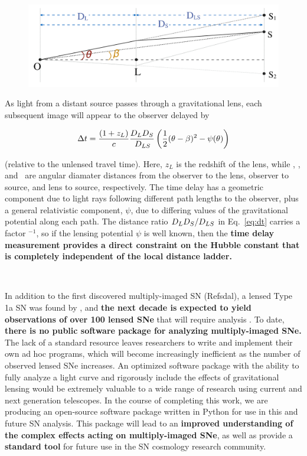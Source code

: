 \pagebreak


\

\begin{figure}[h]
\centering
\vspace{-1em}
\includegraphics[width=.7\textwidth]{FIG/lensingGeometry2}
\end{figure}

As light from a distant
source passes through a gravitational lens, each subsequent image will appear to the observer delayed by 


\begin{equation}\label{eq:dt}
  \Delta t = \frac{(1+z_L)}{c}\frac{D_L D_S}{\,D_{LS}} \left(\frac{1}{2}(\theta-\beta)^2 - \psi(\theta)\right)
\end{equation}

\noindent (relative to the unlensed travel time). Here, $z_L$ is the redshift of the lens, while \Dl, \Ds, 
and \Dls\ are angular diamater distances from the observer to the
lens, observer to source, and lens to source, respectively.  The time
delay has a geometric component due to light rays following different
path lengths to the observer, plus a general relativistic component,
$\psi$, due to differing values of the gravitational potential along
each path. The distance ratio $D_LD_S/D_{LS}$ in Eq.~\ref{eq:dt} carries
a factor \Ho$^{-1}$, so if the lensing potential $\psi$ is well known,
then the {\bf time delay measurement  provides a direct constraint on
the Hubble constant that is completely independent of the local distance
ladder.}

\bigskip


\

In addition to the first discovered multiply-imaged SN (Refsdal), a lensed Type 1a SN was found
by \cite{Goobar:2016}, and \textbf{the next decade is expected to yield observations
of over 100 lensed SNe} that will require analysis \citep{Oguri:2010}.
To date, \textbf{there is no public software package for analyzing multiply-imaged SNe.}
The lack of a standard resource leaves researchers to write and implement their 
own ad hoc programs, which will become increasingly inefficient as the number of
observed lensed SNe increases. An optimized software package with the ability to fully 
analyze a light curve and rigorously include the effects of gravitational lensing would be extremely valuable to a wide range of
research using current and next generation telescopes. In the course of completing this work, 
we are producing an open-source software package written in Python for use in this and future SN analysis. This package will
lead to an \textbf{improved understanding of the complex effects acting on 
multiply-imaged SNe}, as well as provide a \textbf{standard tool} for future use in the SN cosmology 
research community.

